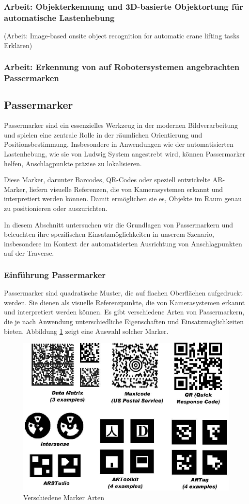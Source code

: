 \subsubsection{Arbeit: Objekterkennung und 3D-basierte Objektortung für automatische Lastenhebung}
(Arbeit: Image-based onsite object recognition for automatic crane lifting tasks\cite{zhou_image-based_2021} Erklären)

\subsubsection{Arbeit: Erkennung von auf Robotersystemen angebrachten Passermarken}


\subsection{Passermarker}
Passermarker sind ein essenzielles Werkzeug in der modernen Bildverarbeitung und spielen eine 
zentrale Rolle in der räumlichen Orientierung und Positionsbestimmung. Insbesondere in Anwendungen 
wie der automatisierten Lastenhebung, wie sie von Ludwig System angestrebt wird, können Passermarker 
helfen, Anschlagpunkte präzise zu lokalisieren.

Diese Marker, darunter Barcodes, QR-Codes oder speziell entwickelte AR-Marker, liefern visuelle 
Referenzen, die von Kamerasystemen erkannt und interpretiert werden können. Damit ermöglichen sie es, 
Objekte im Raum genau zu positionieren oder auszurichten.

In diesem Abschnitt untersuchen wir die Grundlagen von Passermarkern und beleuchten ihre spezifischen 
Einsatzmöglichkeiten in unserem Szenario, insbesondere im Kontext der automatisierten Ausrichtung von 
Anschlagpunkten auf der Traverse.

\subsubsection{Einführung Passermarker}
Passermarker sind quadratische Muster, die auf flachen Oberflächen aufgedruckt werden. 
Sie dienen als visuelle Referenzpunkte, die von Kamerasystemen erkannt und interpretiert 
werden können. Es gibt verschiedene Arten von Passermarkern, die je nach Anwendung 
unterschiedliche Eigenschaften und Einsatzmöglichkeiten bieten. 
Abbildung \ref{fig:marker_types} zeigt eine Auswahl solcher Marker.

\begin{figure}[H]
    \centering
    \includegraphics[width=0.5\linewidth]{graphics/marker_arten.png}
    \caption{Verschiedene Marker Arten}
    \label{fig:marker_types}
\end{figure}

